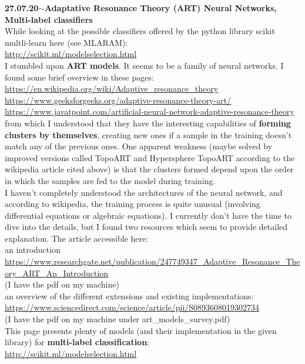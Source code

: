 \documentclass[11pt,a4paper]{article}
\newenvironment{loggentry}[2]%
{\noindent\textbf{#1}\hspace{1cm}$\mathbf{\sim}$\text{ }\textbf{#2}\\}{\vspace{0.5cm}}
\begin{document}
\begin{loggentry}{27.07.20}{Adaptative Resonance Theory (ART) Neural Networks, Multi-label classifiers}

While looking at the possible classifiers offered by the python library scikit multli-learn here (see MLARAM):\\
\url{http://scikit.ml/modelselection.html}\\
I stumbled upon \textbf{ART models}. It seems to be a family of neural networks. I found some brief overview in these pages:\\
\url{https://en.wikipedia.org/wiki/Adaptive_resonance_theory}\\
\url{https://www.geeksforgeeks.org/adaptive-resonance-theory-art/}\\
\url{https://www.javatpoint.com/artificial-neural-network-adaptive-resonance-theory}\\
from which I understood that they have the interesting capabilities of \textbf{forming clusters by themselves}, creating new ones if a sample in the training doesn't match any of the previous ones. One apparent weakness (maybe solved by improved versions called TopoART and Hypersphere TopoART according to the wikipedia article cited above) is that the clusters formed depend upon the order in which the samples are fed to the model during training.\\
I haven't completely understood the architectures of the neural network, and according to wikipedia, the training process is quite unusual (involving differential equations or algebraic equations). I currently don't have the time to dive into the details, but I found two resources which seem to provide detailed explanation. The article accessible here:\\
an introduction
\url{https://www.researchgate.net/publication/247749347_Adaptive_Resonance_Theory_ART_An_Introduction}\\
(I have the pdf on my machine)\\
an overview of the different extensions and existing implementations:\\
\url{https://www.sciencedirect.com/science/article/pii/S0893608019302734}\\
(I have the pdf on my machine under art\_models\_survey.pdf)\\

This page presents plenty of models (and their implementation in the given library) for \textbf{multi-label classification}:\\
\url{http://scikit.ml/modelselection.html}\\

\end{loggentry}
\end{document}
